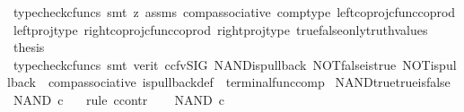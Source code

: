 \begin{isabellebody}
\ {\isacharparenleft}{\kern0pt}typecheck{\isacharunderscore}{\kern0pt}cfuncs{\isacharcomma}{\kern0pt}\ smt\ {\isacharparenleft}{\kern0pt}z{}{\isacharparenright}{\kern0pt}\ assms\ comp{\isacharunderscore}{\kern0pt}associative{}\ comp{\isacharunderscore}{\kern0pt}type\ left{\isacharunderscore}{\kern0pt}coproj{\isacharunderscore}{\kern0pt}cfunc{\isacharunderscore}{\kern0pt}coprod\ left{\isacharunderscore}{\kern0pt}proj{\isacharunderscore}{\kern0pt}type\ right{\isacharunderscore}{\kern0pt}coproj{\isacharunderscore}{\kern0pt}cfunc{\isacharunderscore}{\kern0pt}coprod\ right{\isacharunderscore}{\kern0pt}proj{\isacharunderscore}{\kern0pt}type\ true{\isacharunderscore}{\kern0pt}false{\isacharunderscore}{\kern0pt}only{\isacharunderscore}{\kern0pt}truth{\isacharunderscore}{\kern0pt}values{\isacharparenright}{\kern0pt}\isanewline
\ \ \isamarkupfalse%
\ \isamarkupfalse%
\ {\isacharquery}{\kern0pt}thesis\ \isanewline
\ \ \ \ \isamarkupfalse%
\ {\isacharparenleft}{\kern0pt}typecheck{\isacharunderscore}{\kern0pt}cfuncs{\isacharcomma}{\kern0pt}\ smt\ {\isacharparenleft}{\kern0pt}verit{\isacharcomma}{\kern0pt}\ ccfv{\isacharunderscore}{\kern0pt}SIG{\isacharparenright}{\kern0pt}\ NAND{\isacharunderscore}{\kern0pt}is{\isacharunderscore}{\kern0pt}pullback\ NOT{\isacharunderscore}{\kern0pt}false{\isacharunderscore}{\kern0pt}is{\isacharunderscore}{\kern0pt}true\ NOT{\isacharunderscore}{\kern0pt}is{\isacharunderscore}{\kern0pt}pullback\ \ comp{\isacharunderscore}{\kern0pt}associative{}\ is{\isacharunderscore}{\kern0pt}pullback{\isacharunderscore}{\kern0pt}def\ \ terminal{\isacharunderscore}{\kern0pt}func{\isacharunderscore}{\kern0pt}comp{\isacharparenright}{\kern0pt}\isanewline
{}\isamarkupfalse%
%
\endisatagproof
{\isafoldproof}%
%
\isadelimproof
\isanewline
%
\endisadelimproof
\isanewline
{}\isamarkupfalse%
\ NAND{\isacharunderscore}{\kern0pt}true{\isacharunderscore}{\kern0pt}true{\isacharunderscore}{\kern0pt}is{\isacharunderscore}{\kern0pt}false{\isacharcolon}{\kern0pt}\isanewline
\ {\isachardoublequoteopen}NAND\ {\isasymcirc}\isactrlsub c\ {\isasymlangle}{\isasymt}{\isacharcomma}{\kern0pt}{\isasymt}{\isasymrangle}\ {\isacharequal}{\kern0pt}\ {\isasymf}{\isachardoublequoteclose}\isanewline
%
\isadelimproof
%
\endisadelimproof
%
\isatagproof
{}\isamarkupfalse%
{\isacharparenleft}{\kern0pt}rule\ ccontr{\isacharparenright}{\kern0pt}\isanewline
\ \ \isamarkupfalse%
\ {\isachardoublequoteopen}NAND\ {\isasymcirc}\isactrlsub c\ {\isasymlangle}{\isasymt}{\isacharcomma}{\kern0pt}{\isasymt}{\isasymrangle}\ {\isasymnoteq}\ {\isasymf}{\isachardoublequoteclose}\isanewline

\end{isabellebody}

